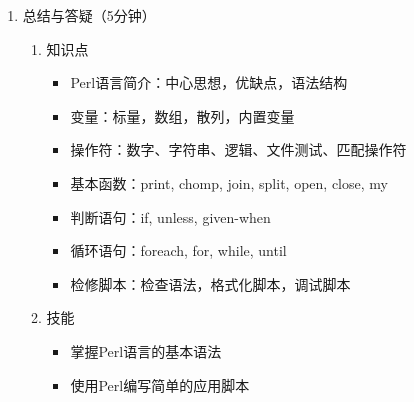 \documentclass{TIJMUjiaoanLL}
\begin{document}
\begin{enumerate}
  \item 总结与答疑（5分钟）
    \begin{enumerate}
      \item 知识点
	\begin{itemize}
          \item Perl语言简介：中心思想，优缺点，语法结构
          \item 变量：标量，数组，散列，内置变量
          \item 操作符：数字、字符串、逻辑、文件测试、匹配操作符
          \item 基本函数：print, chomp, join, split, open, close, my
          \item 判断语句：if, unless, given-when
          \item 循环语句：foreach, for, while, until
          \item 检修脚本：检查语法，格式化脚本，调试脚本
	\end{itemize}
      \item 技能
	\begin{itemize}
          \item 掌握Perl语言的基本语法
          \item 使用Perl编写简单的应用脚本
	\end{itemize}
    \end{enumerate}

\end{enumerate}

\otherTail
\end{document}
